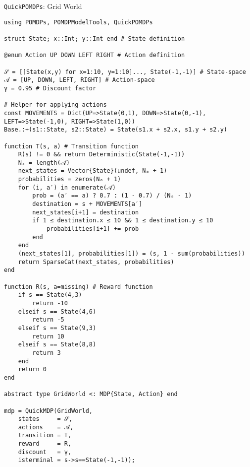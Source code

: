 
\begin{frame}[fragile]{\texttt{QuickPOMDPs}: Grid World}

\begin{lrbox}{\gridworldcode}%
\begin{lstlisting}[language=JuliaLocal, style=julia]
using POMDPs, POMDPModelTools, QuickPOMDPs

struct State; x::Int; y::Int end # State definition

@enum Action UP DOWN LEFT RIGHT # Action definition

𝒮 = [[State(x,y) for x=1:10, y=1:10]..., State(-1,-1)] # State-space
𝒜 = [UP, DOWN, LEFT, RIGHT] # Action-space
γ = 0.95 # Discount factor

# Helper for applying actions
const MOVEMENTS = Dict(UP=>State(0,1), DOWN=>State(0,-1), LEFT=>State(-1,0), RIGHT=>State(1,0))
Base.:+(s1::State, s2::State) = State(s1.x + s2.x, s1.y + s2.y)

function T(s, a) # Transition function
    R(s) != 0 && return Deterministic(State(-1,-1))
    Nₐ = length(𝒜)
    next_states = Vector{State}(undef, Nₐ + 1)
    probabilities = zeros(Nₐ + 1)
    for (i, a′) in enumerate(𝒜)
        prob = (a′ == a) ? 0.7 : (1 - 0.7) / (Nₐ - 1)
        destination = s + MOVEMENTS[a′]
        next_states[i+1] = destination
        if 1 ≤ destination.x ≤ 10 && 1 ≤ destination.y ≤ 10
            probabilities[i+1] += prob
        end
    end    
    (next_states[1], probabilities[1]) = (s, 1 - sum(probabilities))
    return SparseCat(next_states, probabilities)
end

function R(s, a=missing) # Reward function
    if s == State(4,3)
        return -10
    elseif s == State(4,6)
        return -5
    elseif s == State(9,3)
        return 10
    elseif s == State(8,8)
        return 3
    end
    return 0
end

abstract type GridWorld <: MDP{State, Action} end

mdp = QuickMDP(GridWorld,
    states     = 𝒮,
    actions    = 𝒜,
    transition = T,
    reward     = R,
    discount   = γ,
    isterminal = s->s==State(-1,-1));
\end{lstlisting}
\end{lrbox}%




\end{frame}
